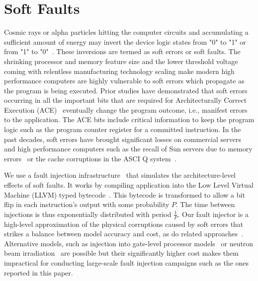 \documentclass{sig-alternate}
\begin{document}
\section{Soft Faults}
\label{sec:soft_faults}

Cosmic rays or alpha particles hitting the computer circuits and accumulating a sufficient amount of energy may invert the device logic states from "0" to "1" or from "1" to "0"~\cite{Ziegler:1996:TCR:226354.226356,baumann:2005}.
These inversions are termed as soft errors or soft faults.
The shrinking processor and memory feature size and the lower threshold voltage coming with relentless manufacturing technology scaling make modern high performance computers are highly vulnerable to soft errors which propagate as the program is being executed.
Prior studies have demonstrated that soft errors occurring in all the important bits that are required for Architecturally Correct Execution (ACE)~\cite{avf:2003} eventually change the program outcome, i.e., manifest errors to the application.
The ACE bits include critical information to keep the program logic such as the program counter register for a committed instruction.
In the past decades, soft errors have brought significant losses on commercial servers and high performance computers such as the recall of Sun servers due to memory errors~\cite{baumann:2005} or the cache corruptions in the ASCI Q system~\cite{asciQSER:2005}.


We use a fault injection infrastructure~\cite{relax:2010} that simulates the architecture-level effects of soft faults.
It works by compiling application into the Low Level Virtual Machine (LLVM) typed bytecode~\cite{LLVM}.
This bytecode is transformed to allow a bit flip in each instruction's output with some probability $P$.
The time between injections is thus exponentially distributed with period $\frac{1}{P}$.
Our fault injector is a high-level approximation of the physical corruptions caused by soft errors that strikes a balance between model accuracy and cost, as do related approaches~\cite{fault_injection:iyer:1997, avf:2003}.
Alternative models, such as injection into gate-level processor models~\cite{sesee:2004} or neutron beam irradiation~\cite{freq_dep:irom:2004} are possible but their significantly higher cost makes them impractical for conducting large-scale fault injection campaigns such as the ones reported in this paper.
\end{document}
